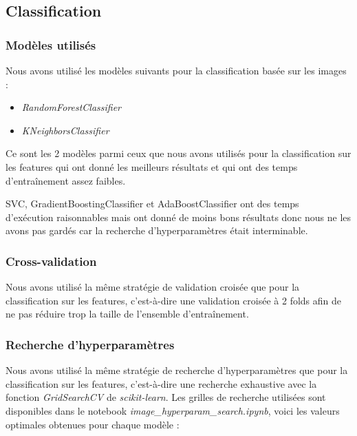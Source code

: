 \documentclass{article}
\begin{document}
\subsection{Classification}

\subsubsection{Modèles utilisés}

Nous avons utilisé les modèles suivants pour la classification basée sur les images :
\begin{itemize}
    \item \textit{RandomForestClassifier} \cite{RFC}
    \item \textit{KNeighborsClassifier} \cite{KNN}
\end{itemize}

Ce sont les 2 modèles parmi ceux que nous avons utilisés pour la classification sur les features
qui ont donné les meilleurs résultats et qui ont des temps d'entraînement assez faibles.

SVC, GradientBoostingClassifier et AdaBoostClassifier ont des temps \\
d'exécution raisonnables mais ont donné de moins bons résultats donc nous
ne les avons pas gardés car la recherche d'hyperparamètres était interminable.

\subsubsection{Cross-validation}
Nous avons utilisé la même stratégie de validation croisée que pour la classification
sur les features, c'est-à-dire une validation croisée à 2 folds afin de ne pas réduire
trop la taille de l'ensemble d'entraînement.

\subsubsection{Recherche d'hyperparamètres}

Nous avons utilisé la même stratégie de recherche d'hyperparamètres que pour la classification
sur les features, c'est-à-dire une recherche exhaustive avec la fonction \textit{GridSearchCV}
\cite{GSCV} de \textit{scikit-learn}. Les grilles de recherche utilisées sont disponibles
dans le notebook \textit{image\_hyperparam\_search.ipynb}, voici les valeurs optimales
obtenues pour chaque modèle :
\end{document}
